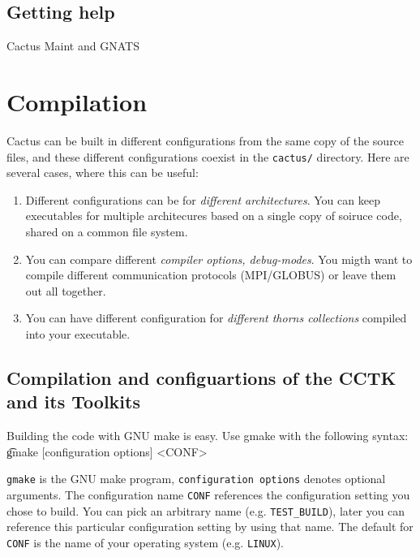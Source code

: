 
\section{Getting help}

Cactus Maint and GNATS


\chapter{Compilation} 



Cactus can be built in different configurations from the same copy of
the source files, and these different configurations coexist in the
{\tt cactus/} directory. Here are several cases, where this can be
useful:

\begin{enumerate}
\item{}Different configurations can be for {\em different
architectures}. You can keep executables for multiple architecures
based on a single copy of soiruce code, shared on a common file
system.
\item{} You can compare different {\em compiler options, debug-modes}.
  You migth want to compile different communication protocols
  (MPI/GLOBUS) or leave them out all together.
\item{} You can have different configuration for {\em different thorns
    collections} compiled into your executable.
\end{enumerate}

\section{Compilation and configuartions of the CCTK and its Toolkits}

Building the code with GNU make is easy. Use gmake with the following syntax:
{\t gmake [configuration options] <CONF>}

{\tt gmake} is the GNU make program, {\tt configuration options}
denotes optional arguments.  The configuration name {\tt CONF}
references the configuration setting you chose to build. You can pick
an arbitrary name (e.g. {\tt TEST\_BUILD}), later you can reference this particular
configuration setting by using that name. The default for {\tt CONF}
is the name of your operating system (e.g. {\tt LINUX}).

